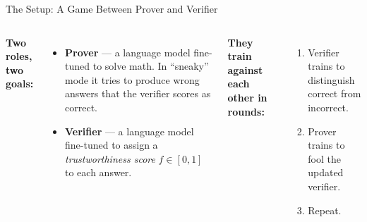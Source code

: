 \documentclass[aspectratio=169]{beamer}
\begin{document}
\begin{frame}{The Setup: A Game Between Prover and Verifier}

  \begin{columns}
    \textbf{Two roles, two goals:}
    \begin{itemize}
      \item \textbf{Prover} --- a language model fine-tuned to solve math.
            In ``sneaky'' mode it tries to produce wrong answers that
            the verifier scores as correct.
      \item \textbf{Verifier} --- a language model fine-tuned to assign a
            \emph{trustworthiness score} $f \in [0,1]$ to each answer.
    \end{itemize}
    \vspace{0.5em}
    \textbf{They train against each other in rounds:}
    \begin{enumerate}
      \item Verifier trains to distinguish correct from incorrect.
      \item Prover trains to fool the updated verifier.
      \item Repeat.
    \end{enumerate}

  \end{columns}

\end{frame}
\end{document}

